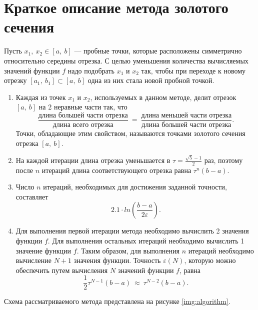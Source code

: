 \documentclass{bmstu}
\begin{document}
\clearpage

\section{Краткое описание метода золотого сечения}

Пусть $x_1, \ x_2 \in [a, \ b]$ --- пробные точки, которые расположены симметрично относительно середины отрезка. С целью уменьшения количества вычисляемых значений функции $f$ надо подобрать $x_1$ и $x_2$ так, чтобы при переходе к новому отрезку $[a_1, \ b_1] \subset [a, \ b]$ одна из них стала новой пробной точкой.

\begin{enumerate}
    \item Каждая из точек $x_1$ и $x_2$, используемых в данном методе, делит отрезок $[a, \ b]$ на 2 неравные части так, что 
    \begin{equation}
        \frac{\text{длина большей части отрезка}}{\text{длина всего отрезка}} \ = \ 
        \frac{\text{длина меньшей части отрезка}}{\text{длина большей части отрезка}}.
    \end{equation}
    Точки, обладающие этим свойством, называются точками золотого сечения отрезка $[a, \ b]$.
    \item На каждой итерации длина отрезка уменьшается в $\tau = \frac{\sqrt{5} - 1}{2}$ раз, поэтому после $n$ итераций длина соответствующего отрезка равна $\tau^n(b - a)$.
    \item Число $n$ итераций, необходимых для достижения заданной точности, составляет
    \begin{equation}
        2.1 \cdot ln(\frac{b - a}{2 \varepsilon}).
    \end{equation}
    \item Для выполнения первой итерации метода необходимо вычислить 2 значения функции $f$. Для выполнения остальных итераций необходимо вычислить 1 значение функции $f$. Таким образом, для выполнения $n$ итераций необходимо вычисление $N + 1$ значения функции. Точность $\varepsilon(N)$, которую можно обеспечить путем вычисления $N$ значений функции $f$, равна
    \begin{equation}
        \frac{1}{2} \tau^{N - 1} (b - a) \ \approx \ \tau^{N - 2} (b - a).
    \end{equation}
\end{enumerate}

\clearpage

Схема рассматриваемого метода представлена на рисунке \ref{img:algorithm}. 
\end{document}
